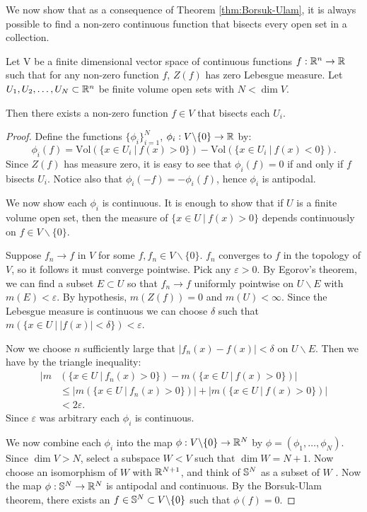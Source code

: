 We now show that as a consequence of Theorem \ref{thm:Borsuk-Ulam}, it is always possible to find a non-zero continuous function that
bisects every open set in a collection. 
\begin{theorem}
Let V be a finite dimensional vector space of continuous functions $f:\mathbb R^n \to \mathbb R$ such that for any non-zero function $f$,
 $Z(f)$ has zero Lebesgue measure. 
Let $U_1,U_2,\dots,U_N \subset \mathbb R^n$ be finite volume  open sets with $N< \dim V$. 

Then there exists a non-zero function $f \in V$ that bisects each $U_i$. \label{thm:GenHamSand}
\end{theorem}
\begin{proof}

Define the functions $\{\phi_i\}_{i=1}^N$, $\phi_i: V\backslash \{0\} \to \mathbb R$ by:
\[
\phi_i(f) = \text{Vol}(\{x\in U_i \ | \ f(x) > 0 \}) - \text{Vol}(\{x\in U_i \ |\ f(x) < 0 \}).
\]
Since $Z(f)$ has measure zero, it is easy to see that $\phi_i(f) = 0$ if and only if $f$ bisects $U_i$. 
Notice also that $\phi_i(-f) = -\phi_i(f)$, hence $\phi_i$ is antipodal. 

We now show each $\phi_i$ is continuous.
It is enough to show that if $U$ is a finite volume open set, then the measure of $\{x\in U\ |\ f(x)>0\}$ depends continuously on $f\in V \backslash \{0\}$.

Suppose $f_n \to f$ in $V$ for some $f,f_n \in V \backslash \{0\}$. $f_n$ converges to $f$ in the topology of $V$, 
so it follows it must converge pointwise. Pick any $\varepsilon >0$. 
By Egorov's theorem, we can find a subset $E\subset U$ so that $f_n \to f$ uniformly pointwise on $U \backslash E$ with $m(E)< \varepsilon$.
By hypothesis, $m(Z(f)) =0$ and $m(U) < \infty$. 
Since the Lebesgue measure is continuous we can choose $\delta$ such that $m\left(\{x\in U\ \big |\ |f(x)|<\delta\}\right) < \varepsilon$.

Now we choose $n$ sufficiently large that $|f_n (x) - f(x)| < \delta$ on $U\backslash E$. Then we have by the triangle inequality:
\begin{align*}
    |m&\left(\{x\in U \ |\ f_n(x)>0\}\right) - m\left(\{x\in U\ |\ f(x)>0\}\right)| \\
    &\leq |m\left(\{x\in U\ |\ f_n(x)>0\}\right)| + |m\left(\{x\in U\ |\ f(x)>0\}\right)| \\
    &< 2 \varepsilon. 
\end{align*}
Since $\varepsilon$ was arbitrary each $\phi_i$ is continuous.

We now combine each $\phi_i$ into the map $\phi : V\backslash \{0\} \to \mathbb R^N$ by $\phi = (\phi_1, \dots, \phi_N)$.
 Since $\dim V > N$, select a subspace $W < V$ such that $\dim W = N+1$. 
Now choose an isomorphism of $W$ with $\mathbb R^{N+1}$, and think of $\mathbb S^N$ as a subset of $W$ .
Now the map $\phi: \mathbb S^N \to \mathbb R^N$ is antipodal and continuous. 
By the Borsuk-Ulam theorem, there exists an $f\in \mathbb S^N \subset V\backslash \{0\}$ such that $\phi(f) = 0$.
\end{proof}

